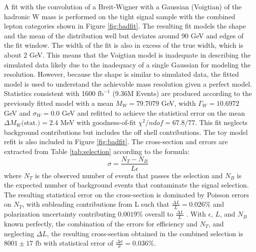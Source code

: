 A fit with the convolution of a Breit-Wigner with a Gaussian (Voigtian) of the hadronic W mass is performed on the tight signal sample with the combined lepton categories shown in Figure \ref{fig:badfit}. The resulting fit models the shape and the mean of the distribution well but deviates around 90 GeV and edges of the fit window. The width of the fit is also in excess of the true width, which is about 2 GeV. This means that the Voigtian model is inadequate in describing the simulated data likely due to the inadequacy of a single Gaussian for modeling the resolution. However, because the shape is similar to simulated data, the fitted model is used to understand the achievable mass resolution given a perfect model. Statistics consistent with 1600 $\text{fb}^{-1}$ (9.36M Events) are produced according to the previously fitted model with a mean  $M_W = 79.7079$ GeV, width $\Gamma_W = 10.6972$ GeV and $\sigma_W = 0.0$ GeV and refitted to achieve the statistical error on the mean $\Delta M_W \text{(stat.)} = 2.4$ MeV with goodness-of-fit $\chi^2 / ndof = 67.8/77$. This fit neglects background contributions but includes the off shell contributions. The toy model refit is also included in Figure \ref{fig:badfit}.
The cross-section and errors are extracted from Table \ref{tab:selection} according to the formula:
\begin{equation}
\sigma = \frac{N_T - N_B}{L \epsilon}
\end{equation}
where $N_T$ is the observed number of events that passes the selection and $N_B$ is the expected number of background events that contaminate the signal selection. The resulting statistical error on the cross-section is dominated by  Poisson errors on $N_T$, with subleading contributions from L such that $\frac{\Delta L}{L} = 0.026 \%$ and polarization uncertainty contributing $0.0019\%$ overall to $\frac{\Delta L}{L}$ \cite{ilcluminosity}. With $\epsilon$, $L$, and $N_B$ known perfectly, the combination of the errors for efficiency and $N_T$, and neglecting $\Delta L$, the resulting cross-section obtained in the combined selection is $8001 \pm 17 \, \, \text{fb}$ with statistical error of $\frac{\Delta \sigma}{\sigma} = 0.036 \%$. 
